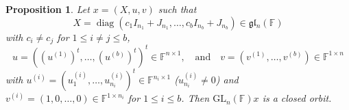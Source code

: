 \documentclass[12pt]{amsart}
\newtheorem{prop}[lm]{Proposition}
\theoremstyle{definition}
\theoremstyle{remark}\newtheorem{rmk}[lm]{Remark}
\newcommand{\GL}{{\mathrm{GL}}}
\newcommand{\diag}{\operatorname{diag}}
\newcommand{\gl}{\mathfrak g \mathfrak l}
\newcommand{\C}{\mathbb{F}}
\begin{document}
	\begin{prop}
		\label{prop:closedorbitmaximalgln}
		Let $x=(X,u,v)$ such that
		\begin{equation*}
			X=\diag(c_1I_{n_1}+J_{n_1},\dots,c_bI_{n_b}+J_{n_b})\in\gl_n(\C)
		\end{equation*}
		with $c_i\neq c_j$ for $1\leq i\neq j\leq b$,
		\begin{equation*}
			u=\left(\left(u^{(1)}\right)^t,\dots,\left(u^{(b)}\right)^t\right)^t\in\C^{n\times 1},\quad\text{and}\quad v=(v^{(1)},\dots,v^{(b)})\in\C^{1\times n}
		\end{equation*}
		with $u^{(i)}=(u_1^{(i)},\dots,u_{n_i}^{(i)})^t\in\C^{n_i\times 1}$ ($u_{n_i}^{(i)}\neq 0$) and $v^{(i)}=(1,0,\dots,0)\in\C^{1\times n_i}$ for $1\leq i\leq b$. Then $\GL_n(\C)x$ is a closed orbit.
	\end{prop}
\end{document}
